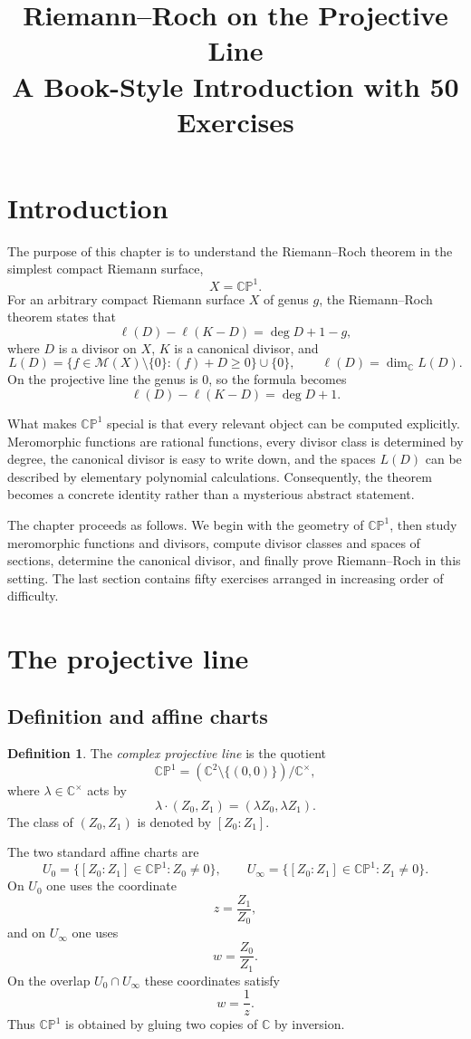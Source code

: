 \documentclass[11pt]{article}
\title{Riemann--Roch on the Projective Line\\[4pt]
\large A Book-Style Introduction with 50 Exercises}
\author{}
\date{}
\newcommand{\C}{\mathbb{C}}
\newcommand{\CP}{\mathbb{CP}}
\newcommand{\MM}{\mathcal{M}}
\newcommand{\degd}{\operatorname{deg}}
\newcommand{\CPone}{\CP^1}
\newcommand{\ellD}{\ell}
\newcommand{\Cstar}{\C^{\times}}
\theoremstyle{plain}
\theoremstyle{definition}
\newtheorem{definition}[theorem]{Definition}
\begin{document}
\maketitle
\tableofcontents

\section{Introduction}
The purpose of this chapter is to understand the Riemann--Roch theorem in the simplest compact Riemann surface,
\[
X=\CPone.
\]
For an arbitrary compact Riemann surface $X$ of genus $g$, the Riemann--Roch theorem states that
\[
\ellD(D)-\ellD(K-D)=\degd D+1-g,
\]
where $D$ is a divisor on $X$, $K$ is a canonical divisor, and
\[
L(D)=\{f\in \MM(X)\setminus\{0\}:(f)+D\ge 0\}\cup\{0\},
\qquad
\ellD(D)=\dim_{\C}L(D).
\]
On the projective line the genus is $0$, so the formula becomes
\[
\ellD(D)-\ellD(K-D)=\degd D+1.
\]

What makes $\CPone$ special is that every relevant object can be computed explicitly. Meromorphic functions are rational functions, every divisor class is determined by degree, the canonical divisor is easy to write down, and the spaces $L(D)$ can be described by elementary polynomial calculations. Consequently, the theorem becomes a concrete identity rather than a mysterious abstract statement.

The chapter proceeds as follows. We begin with the geometry of $\CPone$, then study meromorphic functions and divisors, compute divisor classes and spaces of sections, determine the canonical divisor, and finally prove Riemann--Roch in this setting. The last section contains fifty exercises arranged in increasing order of difficulty.

\section{The projective line}
\subsection{Definition and affine charts}
\begin{definition}
The \emph{complex projective line} is the quotient
\[
\CPone=(\C^2\setminus\{(0,0)\})/\Cstar,
\]
where $\lambda\in\Cstar$ acts by
\[
\lambda\cdot(Z_0,Z_1)=(\lambda Z_0,\lambda Z_1).
\]
The class of $(Z_0,Z_1)$ is denoted by $[Z_0:Z_1]$.
\end{definition}

The two standard affine charts are
\[
U_0=\{[Z_0:Z_1]\in\CPone: Z_0\neq 0\},
\qquad
U_{\infty}=\{[Z_0:Z_1]\in\CPone: Z_1\neq 0\}.
\]
On $U_0$ one uses the coordinate
\[
z=\frac{Z_1}{Z_0},
\]
and on $U_{\infty}$ one uses
\[
w=\frac{Z_0}{Z_1}.
\]
On the overlap $U_0\cap U_{\infty}$ these coordinates satisfy
\[
w=\frac{1}{z}.
\]
Thus $\CPone$ is obtained by gluing two copies of $\C$ by inversion.
\end{document}
